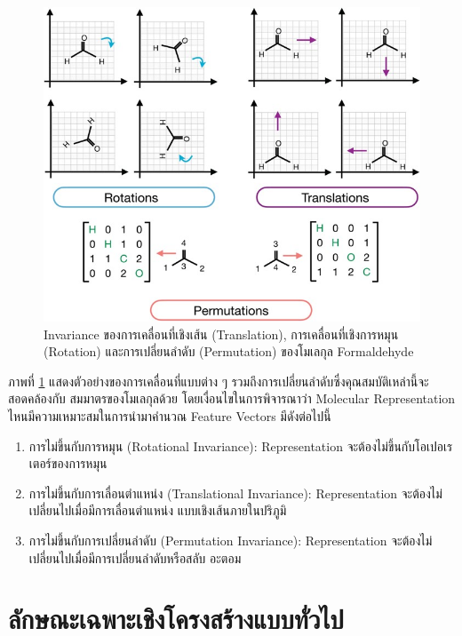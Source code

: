 \begin{figure}[htbp]
    \centering
    \includegraphics[width=\linewidth]{fig/mol_rep_invar.jpg}
    \caption{Invariance ของการเคลื่อนที่เชิงเส้น (Translation), การเคลื่อนที่เชิงการหมุน (Rotation) และการเปลี่ยนลำดับ
    (Permutation) ของโมเลกุล Formaldehyde}
    \label{fig:mol_rep_invariance}
\end{figure}

ภาพที่ \ref{fig:mol_rep_invariance} แสดงตัวอย่างของการเคลื่อนที่แบบต่าง ๆ รวมถึงการเปลี่ยนลำดับซึ่งคุณสมบัติเหล่านี้จะสอดคล้องกับ%
สมมาตรของโมเลกุลด้วย โดยเงื่อนไขในการพิจารณาว่า Molecular Representation ไหนมีความเหมาะสมในการนำมาคำนวณ Feature Vectors 
มีดังต่อไปนี้

\begin{enumerate}[topsep=0pt]
    \item การไม่ขึ้นกับการหมุน (Rotational Invariance): Representation จะต้องไม่ขึ้นกับโอเปอเรเตอร์ของการหมุน
    
    \item การไม่ขึ้นกับการเลื่อนตำแหน่ง (Translational Invariance): Representation จะต้องไม่เปลี่ยนไปเมื่อมีการเลื่อนตำแหน่ง%
    แบบเชิงเส้นภายในปริภูมิ
    
    \item การไม่ขึ้นกับการเปลี่ยนลำดับ (Permutation Invariance): Representation จะต้องไม่เปลี่ยนไปเมื่อมีการเปลี่ยนลำดับหรือสลับ%
    อะตอม
\end{enumerate}

\section{ลักษณะเฉพาะเชิงโครงสร้างแบบทั่วไป}
\label{sec:struc_feat}

